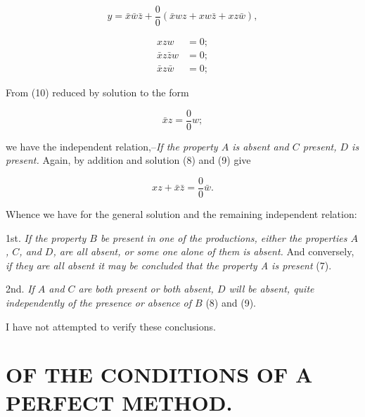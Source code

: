 \documentclass[oneside]{book}
\begin{document}
\begin{equation}
y = \bar{x}\bar{w}\bar{z} + \frac{0}{0}(\bar{x}wz + xw\bar{z} + xz\bar{w}),
\end{equation}

\begin{eqnarray}
xzw &= 0;\\
\bar{x}z\bar{z}w &= 0;\\
\bar{x}z\bar{w} &= 0;
\end{eqnarray}

From (10) reduced by solution to the form

\[
\bar{x}z = \frac{0}{0}w;
\]

we have the independent relation,--\textit{If the property $A$ is absent
and $C$ present, $D$ is present.} Again, by addition and solution (8)
and (9) give

\[
xz + \bar{x}\bar{z} = \frac{0}{0} \bar{w}.
\]

Whence we have for the general solution and the remaining
independent relation:

1st. \textit{If the property $B$ be present in one of the productions, either the properties $A$, $C$, and $D$, are all absent, or some one alone of them
is absent.} And conversely, \textit{if they are all absent it may be
concluded that the property A is present} (7).

2nd. \textit{If $A$ and $C$ are both present or both absent, $D$ will be absent,
quite independently of the presence or absence of $B$} (8) and (9).

I have not attempted to verify these conclusions.

\chapter[CONDITIONS OF A PERFECT METHOD]
{\large OF THE CONDITIONS OF A PERFECT METHOD.}
\end{document}
